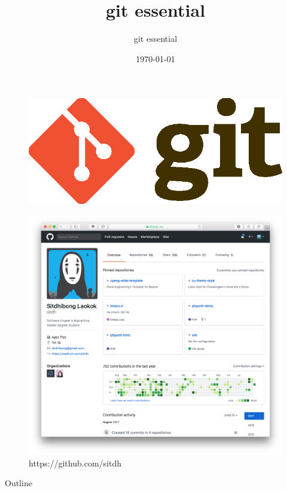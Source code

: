 \documentclass{beamer}
\title{git essential}
\subtitle{git essential}
\date{\today}
\begin{document}
\begin{frame}
    \begin{figure}
        \center
        \includegraphics{git-logo}
        \label{fig:git-logo}
    \end{figure}
\end{frame}

\begin{frame}
    \begin{figure}
        \center
        \includegraphics[width=.8\textwidth]{git-profile}
        \caption{https://github.com/sitdh}
        \label{fig:git-profile}
    \end{figure}
\end{frame}

\begin{frame}{Outline}
    \tableofcontents
\end{frame}
\end{document}
